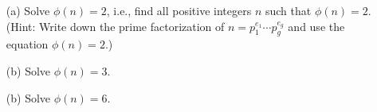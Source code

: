   \mbox{}
  \begin{enumerate}[nosep]
    \item[(a)]
      Solve $\phi(n) = 2$, i.e., find all positive integers $n$ such that
      $\phi(n) = 2$.
      (Hint: Write down the prime factorization of
      $n = p_1^{e_1}\cdots p_g^{e_g}$ and use the
      equation $\phi(n) = 2$.)
    \item[(b)] Solve $\phi(n) = 3$.
    \item[(b)] Solve $\phi(n) = 6$.
  \end{enumerate}
